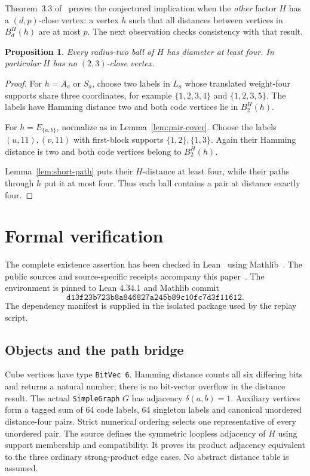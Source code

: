 \documentclass[11pt]{article}
\newtheorem{proposition}[theorem]{Proposition}
\theoremstyle{definition}
\theoremstyle{remark}
\begin{document}
Theorem~3.3 of~\cite{bickz-strong} proves the conjectured
implication when the \emph{other} factor \(H\) has a
\((d,p)\)-close vertex: a vertex \(h\) such that all distances
between vertices in \(B_d^H(h)\) are at most \(p\).
The next observation checks consistency with that result.

\begin{proposition}\label{prop:no-close}
Every radius-two ball of \(H\) has diameter at least four.
In particular \(H\) has no \((2,3)\)-close vertex.
\end{proposition}
\begin{proof}
For \(h=A_a\) or \(S_a\), choose two labels in \(L_a\)
whose translated weight-four supports share three coordinates,
for example \(\{1,2,3,4\}\) and \(\{1,2,3,5\}\).
The labels have Hamming distance two and both code vertices
lie in \(B_2^H(h)\).

For \(h=E_{\{a,b\}}\), normalize as in
Lemma~\ref{lem:pair-cover}. Choose the labels
\((u,11),(v,11)\) with first-block supports
\(\{1,2\},\{1,3\}\). Again their Hamming distance is two
and both code vertices belong to \(B_2^H(h)\).

Lemma~\ref{lem:short-path} puts their \(H\)-distance at least
four, while their paths through \(h\) put it at most four.
Thus each ball contains a pair at distance exactly four.
\end{proof}

\section{Formal verification}\label{sec:formal}
The complete existence assertion has been checked in
Lean~\cite{lean4} using Mathlib~\cite{mathlib}.
The public sources and source-specific receipts accompany
this paper~\cite{repository}. The environment is pinned to
Lean 4.34.1 and Mathlib commit
\[
 \texttt{d13f23b723b8a846827a245b89c10fc7d3f11612}.
\]
The dependency manifest is supplied in the isolated package
used by the replay script.

\subsection{Objects and the path bridge}
Cube vertices have type \texttt{BitVec 6}. Hamming distance
counts all six differing bits and returns a natural number;
there is no bit-vector overflow in the distance result.
The actual \texttt{SimpleGraph} \(G\) has adjacency
\(\delta(a,b)=1\). Auxiliary vertices form a tagged sum
of 64 code labels, 64 singleton labels and canonical
unordered distance-four pairs. Strict numerical ordering
selects one representative of every unordered pair.
The source defines the symmetric loopless adjacency of \(H\)
using support membership and compatibility. It proves its
product adjacency equivalent to the three ordinary
strong-product edge cases. No abstract distance table
is assumed.
\end{document}
